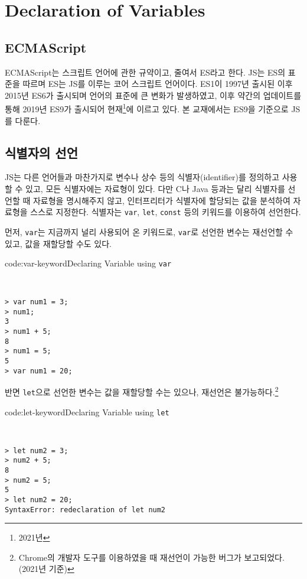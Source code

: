 \section{Declaration of Variables} \label{sect:declaration-of-variables}

\subsection*{ECMAScript}

ECMAScript는 스크립트 언어에 관한 규약이고, 줄여서 ES라고 한다. JS는 ES의 표준을 따르며 ES는 JS를 이루는 코어 스크립트 언어이다. ES1이 1997년 출시된 이후 2015년 ES6가 출시되며 언어의 표준에 큰 변화가 발생하였고, 이후 약간의 업데이트를 통해 2019년 ES9가 출시되어 현재\footnote{2021년}에 이르고 있다. 본 교재에서는 ES9을 기준으로 JS를 다룬다.

\subsection*{식별자의 선언}

JS는 다른 언어들과 마찬가지로 변수나 상수 등의 식별자(identifier)를 정의하고 사용할 수 있고, 모든 식별자에는 자료형이 있다. 다만 C나 Java 등과는 달리 식별자를 선언할 때 자료형을 명시해주지 않고, 인터프리터가 식별자에 할당되는 값을 분석하여 자료형을 스스로 지정한다. 식별자는 \texttt{var}, \texttt{let}, \texttt{const} 등의 키워드를 이용하여 선언한다.

먼저, \texttt{var}는 지금까지 널리 사용되어 온 키워드로, \texttt{var}로 선언한 변수는 재선언할 수 있고, 값을 재할당할 수도 있다.

\begin{codeenv}{code:var-keyword}{Declaring Variable using \texttt{var}}\begin{verbatim}


> var num1 = 3;
> num1;
3
> num1 + 5;
8
> num1 = 5;
5
> var num1 = 20;
\end{verbatim}
\end{codeenv}

반면 \texttt{let}으로 선언한 변수는 값을 재할당할 수는 있으나, 재선언은 불가능하다.\footnote{Chrome의 개발자 도구를 이용하였을 때 재선언이 가능한 버그가 보고되었다. (2021년 기준)}

\begin{codeenv}{code:let-keyword}{Declaring Variable using \texttt{let}}\begin{verbatim}


> let num2 = 3;
> num2 + 5;
8
> num2 = 5;
5
> let num2 = 20;
SyntaxError: redeclaration of let num2
\end{verbatim}
\end{codeenv}
\pagebreak

